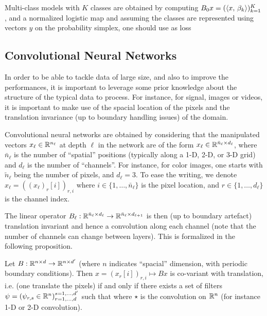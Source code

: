 Multi-class models with $K$ classes are obtained by computing $B_0 x = (\langle x,\,\beta_k\rangle)_{k=1}^K$, and a normalized logistic map 
and assuming the classes are represented using vectors $y$ on the probability simplex, one should use as loss

\subsection{Convolutional Neural Networks}
\label{sec-cnn}

In order to be able to tackle data of large size, and also to improve the performances, it is important to leverage some prior knowledge about the structure of the typical data to process. For instance, for signal, images or videos, it is important to make use of the spacial location of the pixels and the translation invariance (up to boundary handling issues) of the domain.

Convolutional neural networks are obtained by considering that the manipulated vectors $x_\ell \in \mathbb{R}^{n_\ell}$ at depth $\ell$ in the network are of the form $x_\ell \in \mathbb{R}^{ \bar n_\ell \times d_\ell }$, where $\bar n_\ell$ is the number of ``spatial'' positions (typically along a 1-D, 2-D, or 3-D grid) and $d_\ell$ is the number of ``channels''.
%
For instance, for color images, one starts with $\tilde n_\ell$ being the number of pixels, and $d_\ell=3$.
%
To ease the writing, we denote $x_\ell = ( (x_\ell)_r[i] )_{r,i}$ where $i \in \{1,\ldots,\bar n_\ell\}$ is the pixel location, and $r \in \{1,\ldots,d_\ell\}$ is the channel index.

The linear operator $B_\ell : \mathbb{R}^{ \bar n_\ell \times d_\ell } \rightarrow \mathbb{R}^{ \bar n_\ell \times d_{\ell+1} }$ is then (up to boundary artefact) translation invariant and hence a convolution along each channel (note that the number of channels can change between layers). This is formalized in the following proposition.

\begin{prop}
	Let $B : \mathbb{R}^{n \times d} \rightarrow \mathbb{R}^{n \times d'}$ (where $n$ indicates ``spacial'' dimension, with periodic boundary conditions). Then $x = (x_r[i] )_{r,i} \mapsto B x$ is co-variant with translation, i.e. 
	(one translate the pixels) if and only if there exists a set of filters $\psi = ( \psi_{r,s} \in \mathbb{R}^n )_{r=1,\ldots,d}^{s=1,\ldots,d'}$ such that 
	where $\star$ is the convolution on $\mathbb{R}^n$ (for instance 1-D or 2-D convolution). 
\end{prop}


